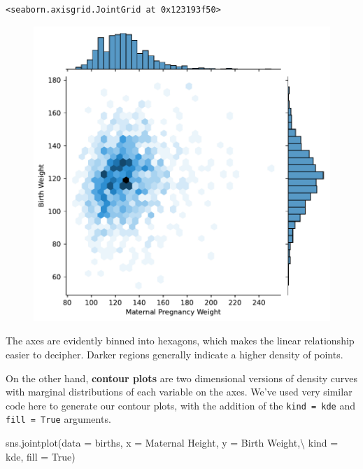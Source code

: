 \documentclass[
  letterpaper,
  DIV=11,
  numbers=noendperiod]{scrreprt}
\newenvironment{Shaded}{\begin{snugshade}}{\end{snugshade}}
\newcommand{\NormalTok}[1]{\textcolor[rgb]{0.00,0.23,0.31}{#1}}
\newcommand{\OperatorTok}[1]{\textcolor[rgb]{0.37,0.37,0.37}{#1}}
\newcommand{\StringTok}[1]{\textcolor[rgb]{0.13,0.47,0.30}{#1}}
\newcommand{\VariableTok}[1]{\textcolor[rgb]{0.07,0.07,0.07}{#1}}
\begin{document}
\begin{verbatim}
<seaborn.axisgrid.JointGrid at 0x123193f50>
\end{verbatim}

\begin{figure}[H]

{\centering \includegraphics{visualization_2/visualization_2_files/figure-pdf/cell-11-output-2.pdf}

}

\end{figure}

The axes are evidently binned into hexagons, which makes the linear
relationship easier to decipher. Darker regions generally indicate a
higher density of points.

On the other hand, \textbf{contour plots} are two dimensional versions
of density curves with marginal distributions of each variable on the
axes. We've used very similar code here to generate our contour plots,
with the addition of the
\texttt{kind\ =\ \textquotesingle{}kde\textquotesingle{}} and
\texttt{fill\ =\ True} arguments.

\begin{Shaded}
\begin{Highlighting}[]
\NormalTok{sns.jointplot(data }\OperatorTok{=}\NormalTok{ births, x }\OperatorTok{=} \StringTok{\textquotesingle{}Maternal Height\textquotesingle{}}\NormalTok{, y }\OperatorTok{=} \StringTok{\textquotesingle{}Birth Weight\textquotesingle{}}\NormalTok{,}\OperatorTok{\textbackslash{}}
\NormalTok{              kind }\OperatorTok{=} \StringTok{\textquotesingle{}kde\textquotesingle{}}\NormalTok{, fill }\OperatorTok{=} \VariableTok{True}\NormalTok{)}
\end{Highlighting}
\end{Shaded}
\end{document}
